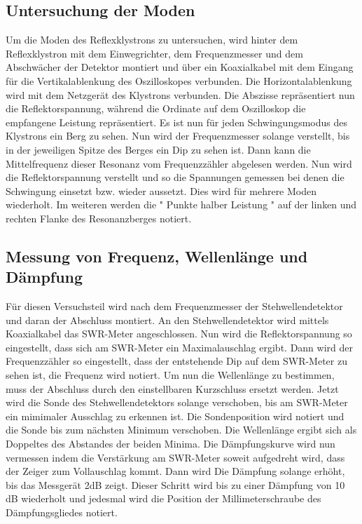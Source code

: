 \subsection{Untersuchung der Moden}
\label{sec:moden}
Um die Moden des Reflexklystrons zu untersuchen, wird hinter dem Reflexklystron mit dem Einwegrichter, dem 
Frequenzmesser und dem Abschwächer der Detektor montiert und über ein Koaxialkabel mit dem Eingang
für die Vertikalablenkung des Oszilloskopes verbunden. Die Horizontalablenkung wird mit dem Netzgerät des Klystrons
verbunden. Die Abszisse repräsentiert nun die Reflektorspannung, während die Ordinate auf dem Oszilloskop
die empfangene Leistung repräsentiert. Es ist nun für jeden Schwingungsmodus des Klystrons ein Berg zu sehen.
Nun wird der Frequenzmesser solange verstellt, bis in der jeweiligen Spitze des Berges ein Dip zu sehen ist.
Dann kann die Mittelfrequenz dieser Resonanz vom Frequenzzähler abgelesen werden. Nun wird die Reflektorspannung
verstellt und so die Spannungen gemessen bei denen die Schwingung einsetzt bzw. wieder aussetzt. Dies wird für mehrere
Moden wiederholt. Im weiteren werden die " Punkte halber Leistung " auf der linken und rechten Flanke des 
Resonanzberges notiert.

\subsection{Messung von Frequenz, Wellenlänge und Dämpfung}
\label{sec:frequenzmessung}
Für diesen Versuchsteil wird nach dem Frequenzmesser der Stehwellendetektor und daran der Abschluss montiert.
An den Stehwellendetektor wird mittels Koaxialkabel das SWR-Meter angeschlossen. Nun wird die Reflektorspannung
so eingestellt, dass sich am SWR-Meter ein Maximalauschlag ergibt. Dann wird der Frequenzzähler so eingestellt, dass 
der entstehende Dip auf dem SWR-Meter zu sehen ist, die Frequenz wird notiert. Um nun die Wellenlänge zu bestimmen,
muss der Abschluss durch den einstellbaren Kurzschluss ersetzt werden. Jetzt wird die Sonde des Stehwellendetektors
solange verschoben, bis am SWR-Meter ein mimimaler Ausschlag zu erkennen ist. Die Sondenposition wird notiert und die
Sonde bis zum nächsten Minimum verschoben. Die Wellenlänge ergibt sich als Doppeltes des Abstandes der beiden 
Minima. Die Dämpfungskurve wird nun vermessen indem die Verstärkung am SWR-Meter soweit aufgedreht wird, dass 
der Zeiger zum Vollauschlag kommt. Dann wird Die Dämpfung solange erhöht, bis das Messgerät 2dB zeigt. Dieser Schritt
wird bis zu einer Dämpfung von 10 dB wiederholt und jedesmal wird die Position der Millimeterschraube des 
Dämpfungsgliedes notiert.


